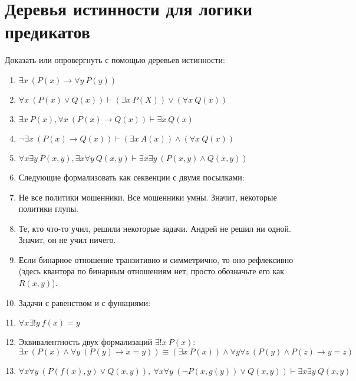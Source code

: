 \documentclass{article}
\newcommand{\itemhard}{\refstepcounter{enumi}\item[\theenumi$^\star$.]}
\begin{document}
\section{Деревья истинности для логики предикатов}
Доказать или опровергнуть с помощью деревьев истинности:
\begin{enumerate}
    \item $\exists x~(P(x) \to \forall y~P(y))$
    \item $\forall x~(P(x) \lor Q(x)) \vdash (\exists x~P(X)) \lor (\forall x~Q(x))$
    \item $\exists x~P(x), \forall x~(P(x) \to Q(x)) \vdash \exists x~Q(x)$
    \item $\neg \exists x~(P(x) \to Q(x)) \vdash (\exists x~A(x)) \land (\forall x~Q(x))$
    \item $\forall x \exists y~P(x,y), \exists x \forall y~Q(x,y) \vdash \exists x \exists y~(P(x,y) \land Q(x,y))$
    \item[] Следующие формализовать как секвенции с двумя посылками:
    \item Не все политики мошенники. Все мошенники умны. Значит, некоторые политики глупы.
    \item Те, кто что-то учил, решили некоторые задачи. Андрей не решил ни одной. Значит, он не учил ничего.
    \item Если бинарное отношение транзитивно и симметрично, то оно рефлексивно (здесь квантора по бинарным отношениям нет, просто обозначьте его как $R(x,y)$).
    \item[] Задачи с равенством и с функциями:
    \item $\forall x \exists! y~f(x)=y$
    \item Эквивалентность двух формализаций $\exists! x~P(x)$:\\$\exists x~(P(x) \land \forall y~(P(y) \to x=y)) \equiv (\exists x~P(x)) \land \forall y \forall z~(P(y) \land P(z) \to y=z)$
    \itemhard $\forall x \forall y~(P(f(x), y) \lor Q(x,y)),~\forall x \forall y~(\neg P(x,g(y)) \lor Q(x,y)) \vdash \exists x \exists y~Q(x,y)$
\end{enumerate}
\end{document}
